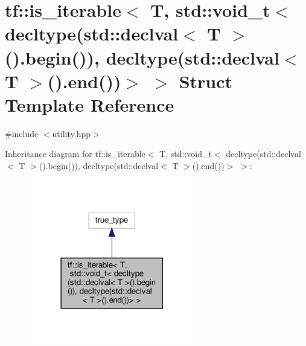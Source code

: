 \hypertarget{structtf_1_1is__iterable_3_01T_00_01std_1_1void__t_3_01decltype_07std_1_1declval_3_01T_01_4_07_0275ba78d7ba399cf74de163921d814a0}{}\section{tf\+:\+:is\+\_\+iterable$<$ T, std\+:\+:void\+\_\+t$<$ decltype(std\+:\+:declval$<$ T $>$().begin()), decltype(std\+:\+:declval$<$ T $>$().end())$>$ $>$ Struct Template Reference}
\label{structtf_1_1is__iterable_3_01T_00_01std_1_1void__t_3_01decltype_07std_1_1declval_3_01T_01_4_07_0275ba78d7ba399cf74de163921d814a0}


{\ttfamily \#include $<$utility.\+hpp$>$}



Inheritance diagram for tf\+:\+:is\+\_\+iterable$<$ T, std\+:\+:void\+\_\+t$<$ decltype(std\+:\+:declval$<$ T $>$().begin()), decltype(std\+:\+:declval$<$ T $>$().end())$>$ $>$\+:\nopagebreak
\begin{figure}[H]
\begin{center}
\leavevmode
\includegraphics[width=206pt]{structtf_1_1is__iterable_3_01T_00_01std_1_1void__t_3_01decltype_07std_1_1declval_3_01T_01_4_07_09bc73e59e9f10718f4eac50bdd178d5a}
\end{center}
\end{figure}


